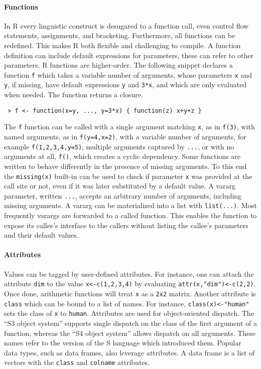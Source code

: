 \documentclass[review,creen,acmsmall]{acmart}
\newcommand{\code}[1]{\lstinline |#1|\xspace}
\renewcommand{\c}[1]{\lstinline |#1|\xspace}
\begin{document}
\paragraph{Functions}
In R every linguistic construct is desugared to a function call, even control
flow statements, assignments, and bracketing. Furthermore, all functions can be
redefined. This makes R both flexible and challenging to compile. A function
definition can include default expressions for parameters, these can refer to
other parameters. R functions are higher-order. The following snippet declares a
function \code f which takes a variable number of arguments, whose parameters
\code x and \code y, if missing, have default expressions \code y and
\code{3*x}, and which are only evaluated when needed. The function returns a closure.
\begin{lstlisting}
 > f <- function(x=y, ..., y=3*x) { function(z) x+y+z }
\end{lstlisting}\vspace{1mm}
\noindent
The \code f function can be called with a single argument matching \code x, as in
\code{f(3)}, with named arguments, as in \code{f(y=4,x=2)}, with a variable
number of arguments, for example \code{f(1,2,3,4,y=5)}, multiple arguments
captured by \code{...}, or with no arguments at all, \code{f()}, which creates a
cyclic dependency. Some functions are written to behave differently in the
presence of missing arguments. To this end the \c{missing(x)} built-in can be
used to check if parameter \code{x} was provided at the call site or not, even
if it was later substituted by a default value. A vararg parameter, written
\code{...}, accepts an arbitrary number of arguments, including missing
arguments. A vararg can be materialized into a list with \code{list(...)}. Most
frequently varargs are forwarded to a called function. This enables the
function to expose its callee's interface to the callers without listing the
callee's parameters and their default values.

\paragraph{Attributes}
Values can be tagged by user-defined attributes. For instance, one can attach
the attribute \code{dim} to the value \code{x<-c(1,2,3,4)} by evaluating
\code{attr(x,"dim")<-c(2,2)}. Once done, arithmetic functions will treat \code x
as a \code{2x2} matrix. Another attribute is \code{class} which can be bound to
a list of names. For instance, \code{class(x)<-"human"} sets the class of
\code{x} to \code{human}. Attributes are used for object-oriented dispatch. The
``S3 object system'' supports single dispatch on the class of the first argument
of a function, whereas the ``S4 object system'' allows dispatch on all
arguments. These names refer to the version of the S language which introduced
them. Popular data types, such as data frames, also leverage attributes. A data
frame is a list of vectors with the \code{class} and \code{colname} attributes.
\end{document}
